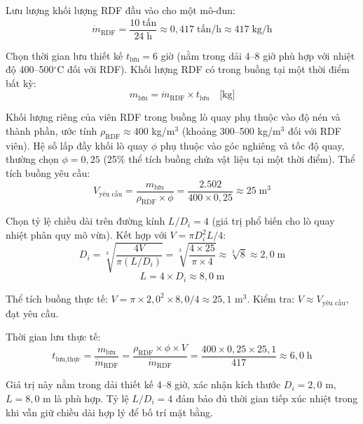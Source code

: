 \documentclass[../main.tex]{subfiles}
\begin{document}
Lưu lượng khối lượng RDF đầu vào cho một mô-đun:
\begin{equation}
\dot{m}_{\text{RDF}} = \frac{10\;\text{tấn}}{24\;\text{h}} \approx 0{,}417\;\text{tấn/h} \approx 417\;\text{kg/h}
\label{eq:luu-luong-rdf-module}
\end{equation}

Chọn thời gian lưu thiết kế $t_{\text{lưu}} = 6$ giờ (nằm trong dải 4--8 giờ phù hợp với nhiệt độ 400--500$^\circ\mathrm{C}$ đối với RDF). Khối lượng RDF có trong buồng tại một thời điểm bất kỳ:
\begin{equation}
m_{\text{lưu}} = \dot{m}_{\text{RDF}} \times t_{\text{lưu}} \quad \text{[kg]}
\end{equation}

Khối lượng riêng của viên RDF trong buồng lò quay phụ thuộc vào độ nén và thành phần, ước tính $\rho_{\text{RDF}} \approx 400$ kg/m$^3$ (khoảng 300--500 kg/m$^3$ đối với RDF viên). Hệ số lấp đầy khối lò quay $\phi$ phụ thuộc vào góc nghiêng và tốc độ quay, thường chọn $\phi = 0{,}25$ (25\% thể tích buồng chứa vật liệu tại một thời điểm). Thể tích buồng yêu cầu:
\begin{equation}
V_{\text{yêu cầu}} = \frac{m_{\text{lưu}}}{\rho_{\text{RDF}} \times \phi}
= \frac{2.502}{400 \times 0{,}25}
\approx 25\;\text{m}^3
\label{eq:the-tich-buong-yeu-cau}
\end{equation}

Chọn tỷ lệ chiều dài trên đường kính $L/D_i = 4$ (giá trị phổ biến cho lò quay nhiệt phân quy mô vừa). Kết hợp với $V = \pi D_i^2 L / 4$:
\begin{equation}
D_i = \sqrt[3]{\frac{4V}{\pi (L/D_i)}}
= \sqrt[3]{\frac{4 \times 25}{\pi \times 4}}
\approx \sqrt[3]{8} \approx 2{,}0\;\text{m}
\end{equation}
\begin{equation}
L = 4 \times D_i \approx 8{,}0\;\text{m}
\end{equation}

Thể tích buồng thực tế: $V = \pi \times 2{,}0^2 \times 8{,}0 / 4 \approx 25{,}1$ m$^3$. Kiểm tra: $V \approx V_{\text{yêu cầu}}$, đạt yêu cầu.

Thời gian lưu thực tế:
\begin{equation}
t_{\text{lưu,thực}} = \frac{m_{\text{lưu}}}{\dot{m}_{\text{RDF}}}
= \frac{\rho_{\text{RDF}} \times \phi \times V}{\dot{m}_{\text{RDF}}}
= \frac{400 \times 0{,}25 \times 25{,}1}{417}
\approx 6{,}0\;\text{h}
\end{equation}

Giá trị này nằm trong dải thiết kế 4--8 giờ, xác nhận kích thước $D_i = 2{,}0$ m, $L = 8{,}0$ m là phù hợp. Tỷ lệ $L/D_i = 4$ đảm bảo đủ thời gian tiếp xúc nhiệt trong khi vẫn giữ chiều dài hợp lý để bố trí mặt bằng.
\end{document}
